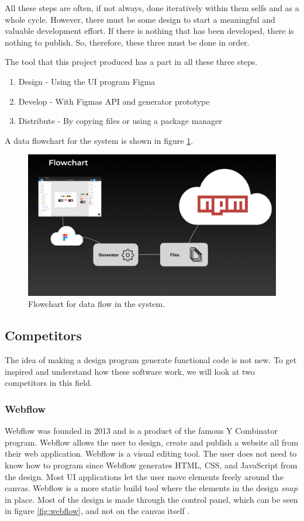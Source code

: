 All these steps are often, if not always, done iteratively within them selfs and as a whole cycle. However, there must be some design to start a meaningful and valuable development effort. If there is nothing that has been developed, there is nothing to publish. So, therefore, these three must be done in order. 

The tool that this project produced has a part in all these three steps. 
\begin{enumerate}
  \item Design - Using the UI program Figma
  \item Develop - With Figmas API and generator prototype
  \item Distribute - By copying files or using a package manager 
\end{enumerate}
A data flowchart for the system is shown in figure \ref{fig:flow}.

\begin{figure}[H]
  \centering
  \includegraphics[width=0.8\linewidth]{images/flow.png}
  \caption{Flowchart for data flow in the system.}%
  \label{fig:flow}
\end{figure}


\subsection{Competitors}%
\label{sub:Competitors}
The idea of making a design program generate functional code is not new. To get inspired and understand how these software work, we will look at two competitors in this field. 

\subsubsection{Webflow}
Webflow was founded in 2013 and is a product of the famous Y Combinator program. Webflow allows the user to design, create and publish a website all from their web application. Webflow is a visual editing tool. The user does not need to know how to program since Webflow generates HTML, CSS, and JavaScript from the design. Most UI applications let the user move elements freely around the canvas. Webflow is a more static build tool where the elements in the design \textit{snap} in place. Most of the design is made through the control panel, which can be seen in figure \ref{fig:webflow}, and not on the canvas itself \cite{ResponsiveWebDesign}. 

